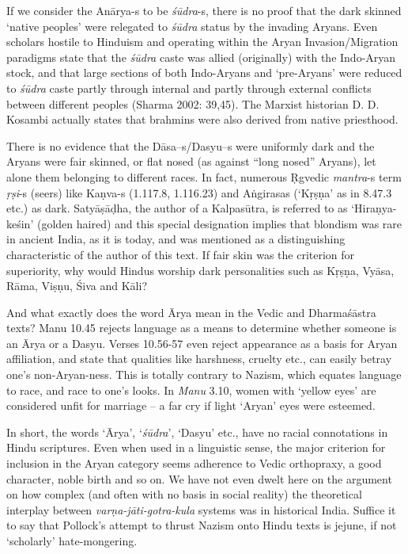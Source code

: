 If we consider the Anārya-s to be \textit{śūdra}-s, there is no proof that the dark skinned ‘native peoples’ were relegated to \textit{śūdra} status by the invading Aryans. Even scholars hostile to Hinduism and operating within the Aryan Invasion/Migration paradigms state that the \textit{śūdra} caste was allied (originally) with the Indo-Aryan stock, and that large sections of both Indo-Aryans and ‘pre-Aryans’ were reduced to \textit{śūdra} caste partly through internal and partly through external conflicts between different peoples (Sharma 2002: 39,45). The Marxist historian D. D. Kosambi actually states that brahmins were also derived from native priesthood.

There is no evidence that the Dāsa--s/Dasyu--s were uniformly dark and the Aryans were fair skinned, or flat nosed (as against “long nosed” Aryans), let alone them belonging to different races. In fact, numerous Ṛgvedic \textit{mantra}-s term \textit{ṛṣi}-s (seers) like Kaṇva-s (1.117.8, 1.116.23) and Aṅgirasas (‘Kṛṣṇa’ as in 8.47.3 etc.) as dark. Satyāṣāḍha, the author of a Kalpasūtra, is referred to as ‘Hiraṇya-keśin’ (golden haired) and this special designation implies that blondism was rare in ancient India, as it is today, and was mentioned as a distinguishing characteristic of the author of this text. If fair skin was the criterion for superiority, why would Hindus worship dark personalities such as Kṛṣṇa, Vyāsa, Rāma, Viṣṇu, Śiva and Kāli?

And what exactly does the word Ārya mean in the Vedic and Dharmaśāstra texts? Manu 10.45 rejects language as a means to determine whether someone is an Ārya or a Dasyu. Verses 10.56-57 even reject appearance as a basis for Aryan affiliation, and state that qualities like harshness, cruelty etc., can easily betray one’s non-Aryan-ness. This is totally contrary to Nazism, which equates language to race, and race to one’s looks. In \textit{Manu} 3.10, women with ‘yellow eyes’ are considered unfit for marriage – a far cry if light ‘Aryan’ eyes were esteemed.

In short, the words ‘Ārya’, ‘\textit{śūdra}’, ‘Dasyu’ etc., have no racial connotations in Hindu scriptures. Even when used in a linguistic sense, the major criterion for inclusion in the Aryan category seems adherence to Vedic orthopraxy, a good character, noble birth and so on. We have not even dwelt here on the argument on how complex (and often with no basis in social reality) the theoretical interplay between \textit{varṇa-jāti-gotra-kula} systems was in historical India. Suffice it to say that Pollock’s attempt to thrust Nazism onto Hindu texts is jejune, if not ‘scholarly’ hate-mongering.

